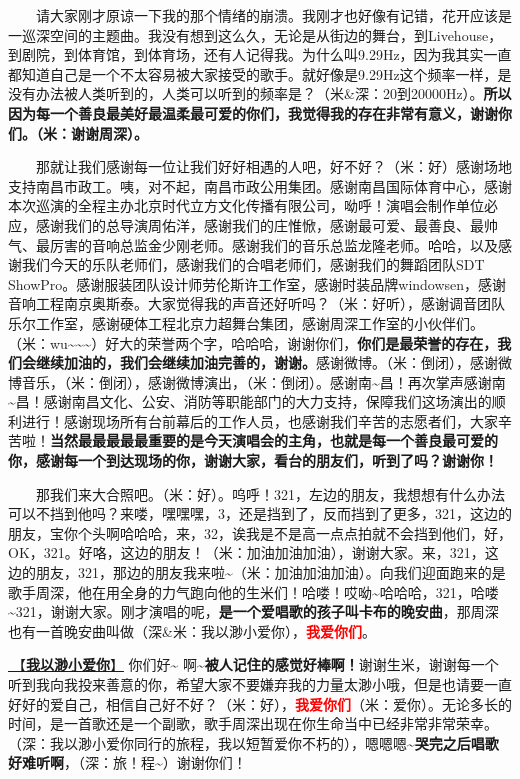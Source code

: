 \documentclass[]{ctexbook}
\begin{document}
  请大家刚才原谅一下我的那个情绪的崩溃。我刚才也好像有记错，花开应该是一巡深空间的主题曲。我没有想到这么久，无论是从街边的舞台，到Livehouse，到剧院，到体育馆，到体育场，还有人记得我。为什么叫9.29Hz，因为我其实一直都知道自己是一个不太容易被大家接受的歌手。就好像是9.29Hz这个频率一样，是没有办法被人类听到的，人类可以听到的频率是？（米\&深：20到20000Hz）。\textbf{所以因为每一个善良最美好最温柔最可爱的你们，我觉得我的存在非常有意义，谢谢你们。（米：谢谢周深）。}

  那就让我们感谢每一位让我们好好相遇的人吧，好不好？（米：好）感谢场地支持南昌市政工。咦，对不起，南昌市政公用集团。感谢南昌国际体育中心，感谢本次巡演的全程主办北京时代立方文化传播有限公司，呦呼！演唱会制作单位必应，感谢我们的总导演周佑洋，感谢我们的庄惟惞，感谢最可爱、最善良、最帅气、最厉害的音响总监金少刚老师。感谢我们的音乐总监龙隆老师。哈哈，以及感谢我们今天的乐队老师们，感谢我们的合唱老师们，感谢我们的舞蹈团队SDT ShowPro。感谢服装团队设计师劳伦斯许工作室，感谢时装品牌windowsen，感谢音响工程南京奥斯泰。大家觉得我的声音还好听吗？（米：好听），感谢调音团队乐尔工作室，感谢硬体工程北京力超舞台集团，感谢周深工作室的小伙伴们。（米：wu\textasciitilde\textasciitilde\textasciitilde）好大的荣誉两个字，哈哈哈，谢谢你们，\textbf{你们是最荣誉的存在，我们会继续加油的，我们会继续加油完善的，谢谢。}感谢微博。（米：倒闭），感谢微博音乐，（米：倒闭），感谢微博演出，（米：倒闭）。感谢南\textasciitilde 昌！再次掌声感谢南\textasciitilde 昌！感谢南昌文化、公安、消防等职能部门的大力支持，保障我们这场演出的顺利进行！感谢现场所有台前幕后的工作人员，也感谢我们辛苦的志愿者们，大家辛苦啦！\textbf{当然最最最最最重要的是今天演唱会的主角，也就是每一个善良最可爱的你，感谢每一个到达现场的你，谢谢大家，看台的朋友们，听到了吗？谢谢你！}

  那我们来大合照吧。（米：好）。呜呼！321，左边的朋友，我想想有什么办法可以不挡到他吗？来喽，嘿嘿嘿，3，还是挡到了，反而挡到了更多，321，这边的朋友，宝你个头啊哈哈哈，来，32，诶我是不是高一点点拍就不会挡到他们，好，OK，321。好咯，这边的朋友！（米：加油加油加油），谢谢大家。来，321，这边的朋友，321，那边的朋友我来啦\textasciitilde（米：加油加油加油）。向我们迎面跑来的是歌手周深，他在用全身的力气跑向他的生米们！哈喽！哎呦\textasciitilde 哈哈哈，321，哈喽\textasciitilde321，谢谢大家。刚才演唱的呢，\textbf{是一个爱唱歌的孩子叫卡布的晚安曲}，那周深也有一首晚安曲叫做（深\&米：我以渺小爱你），\textbf{\textcolor{red}{我爱你们}}。

\hyperref[loving-you-in-my-humble-way]{🎵【\textbf{我以渺小爱你}】} 你们好\textasciitilde{}
啊\textasciitilde{}\textbf{被人记住的感觉好棒啊！}谢谢生米，谢谢每一个听到我向我投来善意的你，希望大家不要嫌弃我的力量太渺小哦，但是也请要一直好好的爱自己，相信自己好不好？（米：好），\textbf{\textcolor{red}{我爱你们}}（米：爱你）。无论多长的时间，是一首歌还是一个副歌，歌手周深出现在你生命当中已经非常非常荣幸。（深：我以渺小爱你同行的旅程，我以短暂爱你不朽的），嗯嗯嗯\textasciitilde{}\textbf{哭完之后唱歌好难听啊}，（深：旅！程\textasciitilde）谢谢你们！
\end{document}
